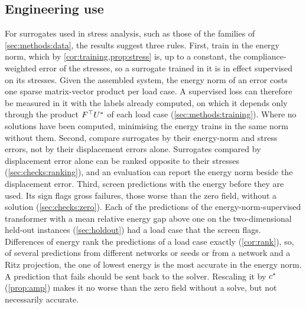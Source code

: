 \subsection{Engineering use}\label{sec:discussion:engineering}
For surrogates used in stress analysis, such as those of the families of
\cref{sec:methods:data}, the results suggest three rules. First, train in the energy norm,
which by \cref{cor:training,prop:stress} is, up to a constant, the compliance-weighted error
of the stresses, so a surrogate trained in it is in effect supervised on its stresses.
Given the assembled system, the energy norm of an error costs one sparse matrix-vector
product per load case. A supervised loss can therefore be measured in it with the labels
already computed, on which it depends only through the product $F^{\top}U^{\ast}$ of each load case (\cref{sec:methods:training}). Where no solutions have been computed, minimising the
energy trains in the same norm without them. Second, compare surrogates by their energy-norm and stress errors, not by their displacement
errors alone. Surrogates compared by displacement error alone can be ranked opposite to their
stresses (\cref{sec:checks:ranking}), and an evaluation can report the energy norm beside the
displacement error. Third, screen
predictions with the energy before they are used. Its sign flags gross failures, those worse
than the zero field, without a solution (\cref{sec:checks:zero}). Each of the \numHoldTwoWorseInstKnorm{}
predictions of the energy-norm-supervised transformer with a mean
relative energy gap above one on the two-dimensional held-out instances (\cref{sec:holdout})
had a load case that the screen flags. Differences of energy rank the predictions of a load case
exactly (\cref{cor:rank}), so, of several predictions from different networks or seeds
or from a network and a Ritz projection, the one of lowest energy is the most accurate in the
energy norm. A prediction that fails should be sent back to the solver. Rescaling it by
$c^{\ast}$ (\cref{prop:amp}) makes it no worse than the zero field without a solve, but not
necessarily accurate.

